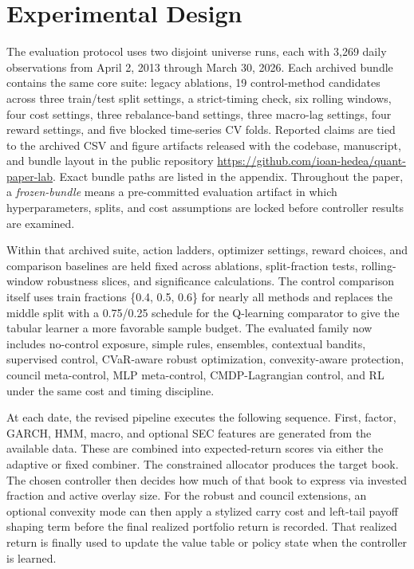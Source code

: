 \documentclass[10pt,twocolumn]{article}
\begin{document}
\section{Experimental Design}

The evaluation protocol uses two disjoint universe runs, each with 3{,}269
daily observations from April 2, 2013 through March 30, 2026. Each archived
bundle contains the same core suite: legacy ablations, 19 control-method
candidates across three train/test split settings, a strict-timing check, six
rolling windows, four cost settings, three rebalance-band settings, three
macro-lag settings, four reward settings, and five blocked time-series CV
folds. Reported claims are tied to the archived CSV and figure artifacts
released with the codebase, manuscript, and bundle layout in the public
repository \url{https://github.com/ioan-hedea/quant-paper-lab}. Exact bundle
paths are listed in the appendix. Throughout the paper, a \emph{frozen-bundle}
means a pre-committed evaluation artifact in which hyperparameters, splits, and
cost assumptions are locked before controller results are examined.

Within that archived suite, action ladders, optimizer settings, reward choices,
and comparison baselines are held fixed across ablations, split-fraction tests,
rolling-window robustness slices, and significance calculations. The control
comparison itself uses train fractions \{0.4, 0.5, 0.6\} for nearly all methods
and replaces the middle split with a 0.75/0.25 schedule for the Q-learning
comparator to give the tabular learner a more favorable sample budget. The
evaluated family now includes no-control exposure, simple rules, ensembles,
contextual bandits, supervised control, CVaR-aware robust optimization,
convexity-aware protection, council meta-control, MLP meta-control,
CMDP-Lagrangian control, and RL under the same cost and timing discipline.

At each date, the revised pipeline executes the following sequence. First,
factor, GARCH, HMM, macro, and optional SEC features are generated from the
available data. These are combined into expected-return scores via either the
adaptive or fixed combiner. The constrained allocator produces the target book.
The chosen controller then decides how much of that book to express via
invested fraction and active overlay size. For the robust and council
extensions, an optional convexity mode can then apply a stylized carry cost and
left-tail payoff shaping term before the final realized portfolio return is
recorded. That realized return is finally used to update the value table or
policy state when the controller is learned.
\end{document}
